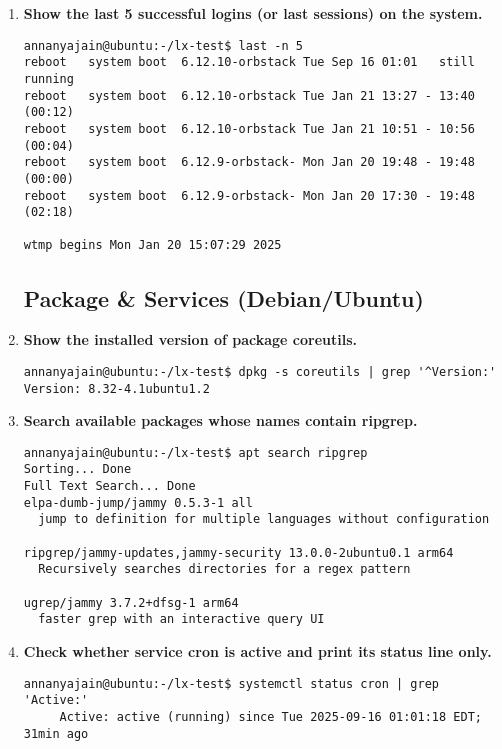 \begin{enumerate}[leftmargin=2em]
\item \textbf{Show the last 5 successful logins (or last sessions) on the system.}
\begin{Verbatim}[formatcom=\color{blue}]
annanyajain@ubuntu:-/lx-test$ last -n 5
reboot   system boot  6.12.10-orbstack Tue Sep 16 01:01   still running
reboot   system boot  6.12.10-orbstack Tue Jan 21 13:27 - 13:40  (00:12)
reboot   system boot  6.12.10-orbstack Tue Jan 21 10:51 - 10:56  (00:04)
reboot   system boot  6.12.9-orbstack- Mon Jan 20 19:48 - 19:48  (00:00)
reboot   system boot  6.12.9-orbstack- Mon Jan 20 17:30 - 19:48  (02:18)

wtmp begins Mon Jan 20 15:07:29 2025
\end{Verbatim}


\subsection{Package \& Services (Debian/Ubuntu)}

\item \textbf{Show the installed version of package coreutils.}
\begin{Verbatim}[formatcom=\color{blue}]
annanyajain@ubuntu:-/lx-test$ dpkg -s coreutils | grep '^Version:'
Version: 8.32-4.1ubuntu1.2

\end{Verbatim}

\item \textbf{Search available packages whose names contain ripgrep.}
\begin{Verbatim}[formatcom=\color{blue}]
annanyajain@ubuntu:-/lx-test$ apt search ripgrep
Sorting... Done
Full Text Search... Done
elpa-dumb-jump/jammy 0.5.3-1 all
  jump to definition for multiple languages without configuration

ripgrep/jammy-updates,jammy-security 13.0.0-2ubuntu0.1 arm64
  Recursively searches directories for a regex pattern

ugrep/jammy 3.7.2+dfsg-1 arm64
  faster grep with an interactive query UI

\end{Verbatim}

\item \textbf{Check whether service cron is active and print its status line only.}
\begin{Verbatim}[formatcom=\color{blue}]
annanyajain@ubuntu:-/lx-test$ systemctl status cron | grep 'Active:'
     Active: active (running) since Tue 2025-09-16 01:01:18 EDT; 31min ago


\end{Verbatim}
\end{enumerate}
